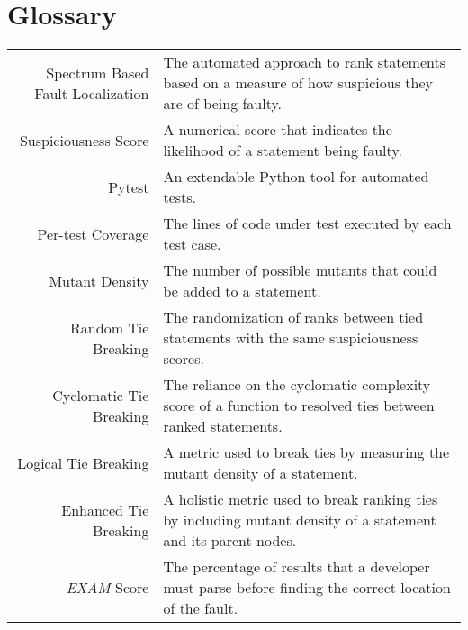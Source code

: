 \chapter*{Glossary} 
\begin{center}
\begin{longtable}{r p{}}
Spectrum Based Fault Localization & The automated approach to rank statements
based on a measure of how suspicious they are of being faulty.\\
Suspiciousness Score & A numerical score that indicates the likelihood of a
statement being faulty.\\
Pytest & An extendable Python tool for automated tests.\\
Per-test Coverage & The lines of code under test executed by each test case.\\
Mutant Density & The number of possible mutants that could be added to a statement.\\
Random Tie Breaking & The randomization of ranks between tied statements with
the same suspiciousness scores.\\
Cyclomatic Tie Breaking & The reliance on the cyclomatic complexity score of a
function to resolved ties between ranked statements.\\
Logical Tie Breaking & A metric used to break ties by measuring the mutant
density of a statement.\\
Enhanced Tie Breaking & A holistic metric used to break ranking ties by
including mutant density of a statement and its parent nodes.\\
\emph{EXAM} Score & The percentage of results that a developer must parse before
finding the correct location of the fault.\\

\end{longtable}
\end{center}
